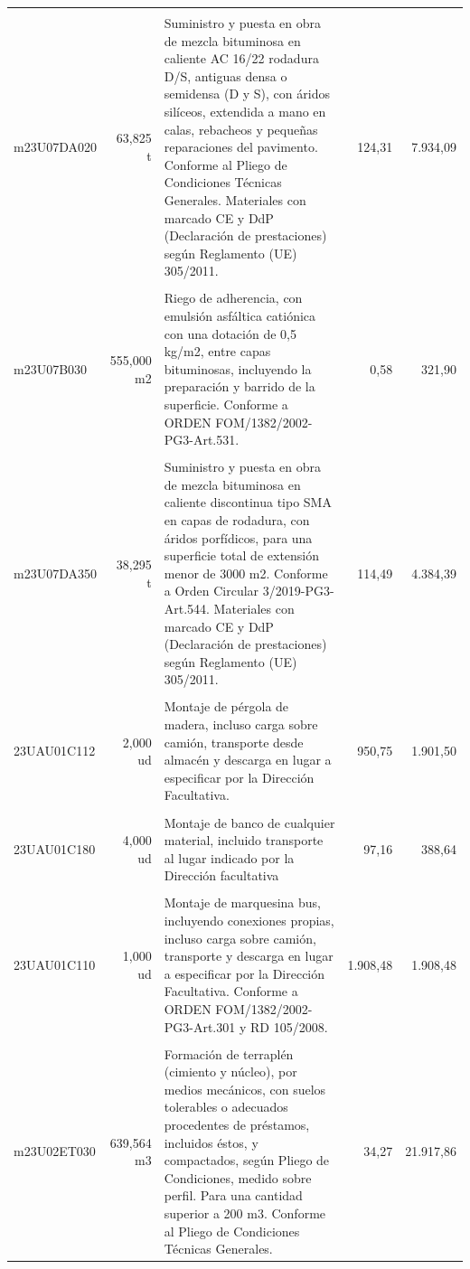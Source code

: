 \documentclass{book}%
\begin{document}
\begin{longtable}{lrlrr}
&&&&\\%
m23U07DA020&    63,825 t&\multicolumn{1}{p{5cm}}{Suministro y puesta en obra de mezcla bituminosa en caliente AC 16/22 rodadura D/S, antiguas densa o semidensa (D y S), con áridos silíceos, extendida a mano en calas, rebacheos y pequeñas reparaciones del pavimento. Conforme al Pliego de Condiciones Técnicas Generales. Materiales con marcado CE y DdP (Declaración de prestaciones) según Reglamento (UE) 305/2011.}&    124,31&7.934,09\\%
&&&&\\%
m23U07B030&   555,000 m2&\multicolumn{1}{p{5cm}}{Riego de adherencia, con emulsión asfáltica catiónica con una dotación de 0,5 kg/m2, entre capas bituminosas, incluyendo la preparación y barrido de la superficie. Conforme a ORDEN FOM/1382/2002{-}PG3{-}Art.531.}&      0,58&321,90\\%
&&&&\\%
m23U07DA350&    38,295 t&\multicolumn{1}{p{5cm}}{Suministro y puesta en obra de mezcla bituminosa en caliente discontinua tipo SMA en capas de rodadura, con áridos porfídicos, para una superficie total de extensión menor de 3000 m2. Conforme a Orden Circular 3/2019{-}PG3{-}Art.544. Materiales con marcado CE y DdP (Declaración de prestaciones) según Reglamento (UE) 305/2011.}&    114,49&4.384,39\\%
&&&&\\%
23UAU01C112&     2,000 ud&\multicolumn{1}{p{5cm}}{Montaje de pérgola de madera, incluso carga sobre camión, transporte desde almacén y descarga en lugar a especificar por la Dirección Facultativa.}&    950,75&1.901,50\\%
&&&&\\%
23UAU01C180&     4,000 ud&\multicolumn{1}{p{5cm}}{Montaje de banco de cualquier material, incluido transporte al lugar indicado por la Dirección facultativa}&     97,16&388,64\\%
&&&&\\%
23UAU01C110&     1,000 ud&\multicolumn{1}{p{5cm}}{Montaje de marquesina bus, incluyendo conexiones propias, incluso carga sobre camión, transporte y descarga en lugar a especificar por la Dirección Facultativa. Conforme a ORDEN FOM/1382/2002{-}PG3{-}Art.301 y RD 105/2008.}&  1.908,48&1.908,48\\%
&&&&\\%
m23U02ET030&   639,564 m3&\multicolumn{1}{p{5cm}}{Formación de terraplén (cimiento y núcleo), por medios mecánicos, con suelos tolerables o adecuados procedentes de préstamos, incluidos éstos, y compactados, según Pliego de Condiciones, medido sobre perfil. Para una cantidad superior a 200 m3. Conforme al Pliego de Condiciones Técnicas Generales.}&     34,27&21.917,86\\%

\end{longtable}
\end{document}
